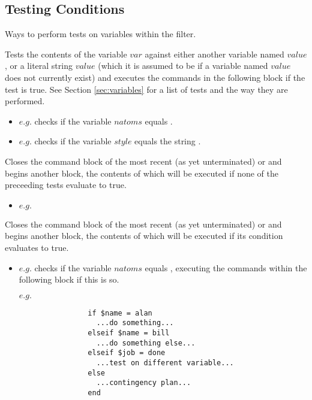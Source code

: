 \subsection{Testing Conditions}
Ways to perform tests on variables within the filter.\\
\begin{description}

	\item[if $var$ $test$ $value$\its]
	Tests the contents of the variable $var$ against either another variable named $value$, or a literal string $value$ (which it is assumed to be if a variable named $value$ does not currently exist) and executes the commands in the following block if the test is true. See Section \ref{sec:variables} for a list of tests and the way they are performed.
	\begin{itemize}
		\item $e.g.$  checks if the variable $natoms$ equals .
		\item $e.g.$  checks if the variable $style$ equals the string .
	\end{itemize}

	\item[else\its]
	Closes the command block of the most recent (as yet unterminated)  or  and begins another block, the contents of which will be executed if none of the preceeding tests evaluate to true.
	\begin{itemize}
		\item $e.g.$ 
	\end{itemize}

	\item[elseif $var$ $test$ $value$\its]
	Closes the command block of the most recent (as yet unterminated)  or  and begins another  block, the contents of which will be executed if its condition evaluates to true.
	\begin{itemize}
		\item $e.g.$  checks if the variable $natoms$ equals , executing the commands within the following block if this is so.
	\end{itemize}
	
	\item
		\begin{itemize}
			\item[$e.g.$]
			\begin{verbatim}
				if $name = alan
				  ...do something...
				elseif $name = bill
				  ...do something else...
				elseif $job = done
				  ...test on different variable...
				else
				  ...contingency plan...
				end
			\end{verbatim}
		\end{itemize}

\end{description}





